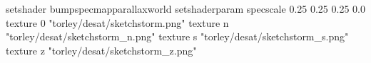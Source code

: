 setshader bumpspecmapparallaxworld
setshaderparam specscale 0.25 0.25 0.25 0.0
texture 0 "torley/desat/sketchstorm.png"
texture n "torley/desat/sketchstorm_n.png"
texture s "torley/desat/sketchstorm_s.png"
texture z "torley/desat/sketchstorm_z.png"

